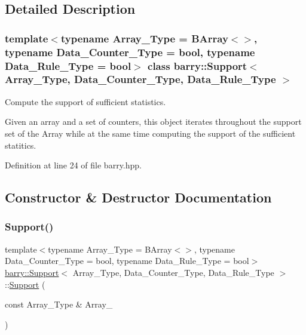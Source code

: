 \subsection{Detailed Description}
\subsubsection*{template$<$typename Array\+\_\+\+Type = B\+Array$<$$>$, typename Data\+\_\+\+Counter\+\_\+\+Type = bool, typename Data\+\_\+\+Rule\+\_\+\+Type = bool$>$\newline
class barry\+::\+Support$<$ Array\+\_\+\+Type, Data\+\_\+\+Counter\+\_\+\+Type, Data\+\_\+\+Rule\+\_\+\+Type $>$}

Compute the support of sufficient statistics. 

Given an array and a set of counters, this object iterates throughout the support set of the Array while at the same time computing the support of the sufficient statitics. 

Definition at line 24 of file barry.\+hpp.



\subsection{Constructor \& Destructor Documentation}
\mbox{\label{classbarry_1_1_support_a094ac08cd4cd58c9b2dd5043cf2cdd13}} 
\subsubsection{\texorpdfstring{Support()}{Support()}\hspace{0.1cm}{\footnotesize\ttfamily [1/3]}}
{\footnotesize\ttfamily template$<$typename Array\+\_\+\+Type  = B\+Array$<$$>$, typename Data\+\_\+\+Counter\+\_\+\+Type  = bool, typename Data\+\_\+\+Rule\+\_\+\+Type  = bool$>$ \\
\hyperlink{classbarry_1_1_support}{barry\+::\+Support}$<$ Array\+\_\+\+Type, Data\+\_\+\+Counter\+\_\+\+Type, Data\+\_\+\+Rule\+\_\+\+Type $>$\+::\hyperlink{classbarry_1_1_support}{Support} (\begin{DoxyParamCaption}\item[{const Array\+\_\+\+Type \&}]{Array\+\_\+ }\end{DoxyParamCaption})\hspace{0.3cm}{\ttfamily [inline]}}



